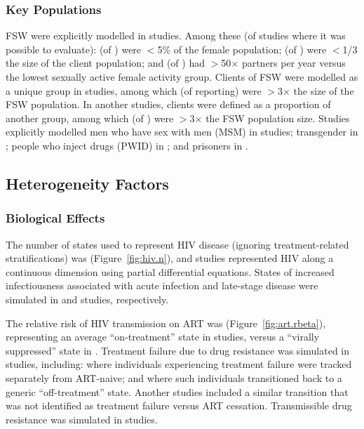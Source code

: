\subsubsection{Key Populations}
\label{sss:res:kp}
FSW were explicitly modelled in  studies.
Among these (of studies where it was possible to evaluate):
 (of ) were {$<$5\%} of the female population;
 (of ) were {$<$1/3} the size of the client population; and
 (of ) had {$>$50$\times$} partners per year versus
the lowest sexually active female activity group.
Clients of FSW were modelled as a unique group in  studies,
among which  (of  reporting)
were {$>$3$\times$} the size of the FSW population.
In another  studies, clients were defined as a proportion of another group,
among which  (of )
were {$>$3$\times$} the FSW population size.
Studies explicitly modelled men who have sex with men (MSM)
in  studies;
transgender in ;
people who inject drugs (PWID) in ; and
prisoners in .
\subsection{Heterogeneity Factors}
\label{ss:res:factors}
\subsubsection{Biological Effects}
\label{sss:res:bio}
The \xdmdef number of states used to represent HIV disease
(ignoring treatment-related stratifications) was  (Figure~\ref{fig:hiv.n}),
and  studies represented HIV along a continuous dimension
using partial differential equations.
States of increased infectiousness associated with acute infection and late-stage disease
were simulated in  and  studies, respectively.
\par
The relative risk of HIV transmission on ART was 
(Figure~\ref{fig:art.rbeta}),
representing an average ``on-treatment'' state in  studies,
versus a ``virally suppressed'' state in .
Treatment failure due to drug resistance was simulated in  studies, including:
 where individuals experiencing treatment failure
were tracked separately from ART-naive; and
 where such individuals
transitioned back to a generic ``off-treatment'' state.
Another  studies included a similar transition
that was not identified as treatment failure versus ART cessation.
Transmissible drug resistance was simulated in  studies.
